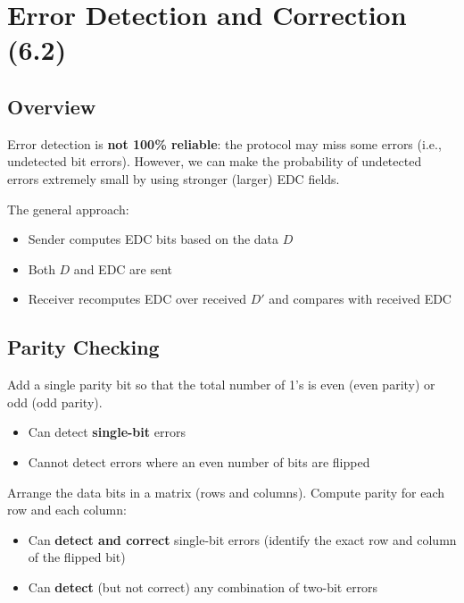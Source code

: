\section{Error Detection and Correction (6.2)}

\subsection{Overview}

\begin{keybox}
Error detection is \textbf{not 100\% reliable}: the protocol may miss some errors (i.e., undetected bit errors). However, we can make the probability of undetected errors extremely small by using stronger (larger) EDC fields.

The general approach:
\begin{itemize}[noitemsep]
    \item Sender computes EDC bits based on the data $D$
    \item Both $D$ and EDC are sent
    \item Receiver recomputes EDC over received $D'$ and compares with received EDC
\end{itemize}
\end{keybox}

\subsection{Parity Checking}

\begin{keybox}
Add a single parity bit so that the total number of 1's is even (even parity) or odd (odd parity).
\begin{itemize}[noitemsep]
    \item Can detect \textbf{single-bit} errors
    \item Cannot detect errors where an even number of bits are flipped
\end{itemize}
\end{keybox}

\begin{keybox}
Arrange the data bits in a matrix (rows and columns). Compute parity for each row and each column:
\begin{itemize}[noitemsep]
    \item Can \textbf{detect and correct} single-bit errors (identify the exact row and column of the flipped bit)
    \item Can \textbf{detect} (but not correct) any combination of two-bit errors
\end{itemize}
\end{keybox}

